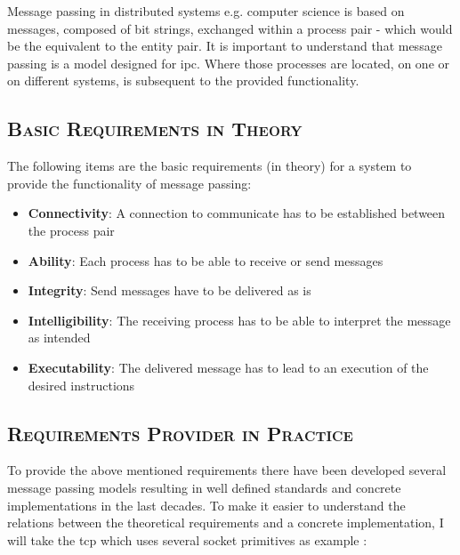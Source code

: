 \documentclass[xcolor=dvipsnames]{article}
\begin{document}
\noindent Message passing in distributed systems e.g. computer science is based on messages, composed of bit strings, exchanged within a process pair - which would be the equivalent to the entity pair. It is important to understand that message passing is a model designed for \gls{ipc}. Where those processes are located, on one or on different systems, is subsequent to the provided functionality.\\

\subsection{\scshape{Basic Requirements in Theory}}

\noindent The following items are the basic requirements (in theory) for a system to provide the functionality of message passing:

\begin{itemize}

\item \textbf{Connectivity}: A connection to communicate has to be established between the process pair
\item \textbf{Ability}: Each process has to be able to receive or send messages
\item \textbf{Integrity}: Send messages have to be delivered as is
\item \textbf{Intelligibility}: The receiving process has to be able to interpret the message as intended
\item \textbf{Executability}: The delivered message has to lead to an execution of the desired instructions

\end{itemize}

\subsection{\scshape{Requirements Provider in Practice}}

\noindent To provide the above mentioned requirements there have been developed several message passing models resulting in well defined standards and concrete implementations in the last decades. To make it easier to understand the relations between the theoretical requirements and a concrete implementation, I will take the \gls{tcp} which uses several socket primitives as example \cite[chap 4.3.1 on p. 141 - 142]{tanenbaum}:
\end{document}
